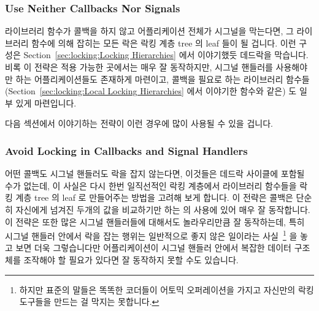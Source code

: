 \subsubsection{Use Neither Callbacks Nor Signals}
\label{sec:locking:Use Neither Callbacks Nor Signals}

라이브러리 함수가 콜백을 하지 않고 어플리케이션 전체가 시그널을 막는다면, 그
라이브러리 함수에 의해 잡히는 모든 락은 락킹 계층 tree 의 leaf 들이 될 겁니다.
이런 구성은 Section~\ref{sec:locking:Locking Hierarchies} 에서 이야기했듯
데드락을 막습니다.
비록 이 전략은 적용 가능한 곳에서는 매우 잘 동작하지만, 시그널 핸들러를
사용해야만 하는 어플리케이션들도 존재하게 마련이고, 콜백을 필요로 하는
라이브러리 함수들 (Section~\ref{sec:locking:Local Locking Hierarchies} 에서
이야기한  함수와 같은) 도 일부 있게 마련입니다.

다음 섹션에서 이야기하는 전략이 이런 경우에 많이 사용될 수 있을 겁니다.

\subsubsection{Avoid Locking in Callbacks and Signal Handlers}
\label{sec:locking:Avoid Locking in Callbacks and Signal Handlers}

어떤 콜백도 시그널 핸들러도 락을 잡지 않는다면, 이것들은 데드락 사이클에 포함될
수가 없는데, 이 사실은 다시 한번 일직선적인 락킹 계층에서 라이브러리 함수들을
락킹 계층 tree 의 leaf 로 만들어주는 방법을 고려해 보게 합니다.
이 전략은 콜백은 단순히 자신에게 넘겨진 두개의 값을 비교하기만 하는 
의 사용에 있어 매우 잘 동작합니다.
이 전략은 또한 많은 시그널 핸들러들에 대해서도 놀라우리만큼 잘 동작하는데, 특히
시그널 핸들러 안에서 락을 잡는 행위는 일반적으로 좋지 않은 일이라는
사실~\cite{TheOpenGroup1997SUS}\footnote{
	하지만 표준의 말들은 똑똑한 코더들이 어토믹 오퍼레이션을 가지고
	자신만의 락킹 도구들을 만드는 걸 막지는 못합니다.}
을 놓고 보면 더욱 그렇습니다만 어플리케이션이 시그널 핸들러 안에서 복잡한
데이터 구조체를 조작해야 할 필요가 있다면 잘 동작하지 못할 수도 있습니다.

